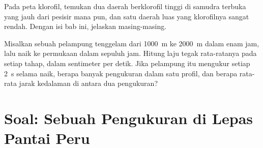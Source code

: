\begin{exercise}[$\star\star\star$]\label{exo:g10:layered-ocean:14}
Pada peta klorofil, temukan dua daerah berklorofil tinggi di samudra terbuka
yang jauh dari pesisir mana pun, dan satu daerah luas yang klorofilnya sangat
rendah. Dengan isi bab ini, jelaskan masing-masing.
\end{exercise}

\begin{exercise}[$\star\star\star$]\label{exo:g10:layered-ocean:15}
Misalkan sebuah pelampung tenggelam dari \qty{1000}{m} ke \qty{2000}{m} dalam
enam jam, lalu naik ke permukaan dalam sepuluh jam. Hitung laju tegak
rata-ratanya pada setiap tahap, dalam sentimeter per detik. Jika pelampung itu
mengukur setiap \qty{2}{s} selama naik, berapa banyak pengukuran dalam satu
profil, dan berapa rata-rata jarak kedalaman di antara dua pengukuran?
\end{exercise}

\section{Soal: Sebuah Pengukuran di Lepas Pantai Peru}

